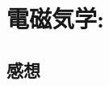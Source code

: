 \documentclass[../../sp_2021.tex]{subfiles}
\begin{document}
\setcounter{section}{2}
\section{電磁気学: }
\subsection{}



\subsection*{感想}
\end{document}
